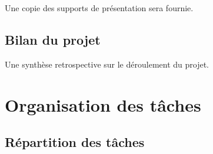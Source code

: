 Une copie des supports de présentation sera fournie.

\subsection{Bilan du projet}

Une synthèse retrospective sur le déroulement du projet.

\section{Organisation des tâches}

\subsection{Répartition des tâches}

